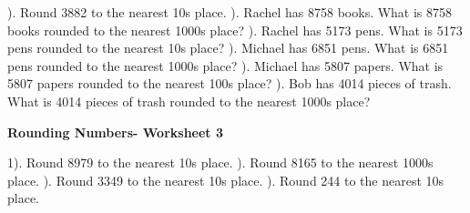 \documentclass{article}%
\begin{document}
\newline%
\newline%
). Round 3882 to the nearest 10s place.%
\newline%
\newline%
). Rachel has 8758 books. What is 8758 books rounded to the nearest 1000s place?%
\newline%
\newline%
). Rachel has 5173 pens. What is 5173 pens rounded to the nearest 10s place?%
\newline%
\newline%
). Michael has 6851 pens. What is 6851 pens rounded to the nearest 1000s place?%
\newline%
\newline%
). Michael has 5807 papers. What is 5807 papers rounded to the nearest 100s place?%
\newline%
\newline%
). Bob has 4014 pieces of trash. What is 4014 pieces of trash rounded to the nearest 1000s place?%
\newline%
\newline%
\newline%
\pagebreak%
\large%
\begin{center}%
\textbf{Rounding Numbers- Worksheet 3}%
\newline%
\newline%
\newline%
\end{center} \normalsize%
1). Round 8979 to the nearest 10s place.%
\newline%
\newline%
). Round 8165 to the nearest 1000s place.%
\newline%
\newline%
). Round 3349 to the nearest 10s place.%
\newline%
\newline%
). Round 244 to the nearest 10s place.%
\newline%
\newline%
\newline%
\end{document}
